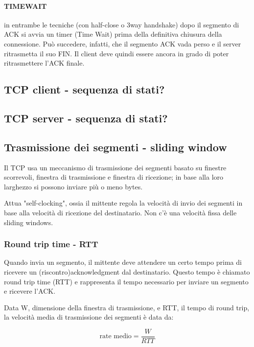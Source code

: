 \paragraph{TIMEWAIT}
in entrambe le tecniche (con
half-close o 3way handshake) dopo il segmento
di ACK si avvia un timer (Time Wait) prima della
definitiva chiusura della connessione. Può
succedere, infatti, che il segmento ACK vada
perso e il server ritrasmetta il suo FIN. Il client
deve quindi essere ancora in grado di poter
ritrasmettere l'ACK finale.

\subsection{TCP client - sequenza di stati?}
\subsection{TCP server - sequenza di stati?}



\subsection{Trasmissione dei segmenti - sliding window}
Il TCP usa un meccanismo di trasmissione dei segmenti basato su finestre scorrevoli, finestra di trasmissione e finestra di ricezione; in base alla loro larghezzo si possono inviare più o meno bytes.

Attua "self-clocking", ossia il mittente regola la velocità di invio dei segmenti in base alla velocità di ricezione del destinatario. Non c'è una velocità fissa delle sliding windows.

 \subsubsection{Round trip time - RTT}
Quando invia un segmento, il mittente deve attendere un certo tempo prima di ricevere un (riscontro)acknowledgment dal destinatario. Questo tempo è chiamato round trip time (RTT) e rappresenta il tempo necessario per inviare un segmento e ricevere l'ACK.
 
Data W, dimensione della finestra di trasmissione, e RTT, il tempo di round trip, la velocità media di trasmissione dei segmenti è data da:

\begin{equation}
    \text{rate medio} = \frac{W}{RTT}
\end{equation}

